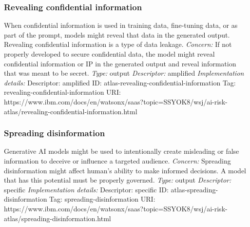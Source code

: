 \documentclass{article}
\begin{document}
\subsubsection*{Revealing confidential information}
When confidential information is used in training data, fine-tuning data, or as part of the prompt, models might reveal that data in the generated output. Revealing confidential information is a type of data leakage.\newline
\textit{Concern: }If not properly developed to secure confidential data, the model might reveal confidential information or IP in the generated output and reveal information that was meant to be secret.\newline\newline
\textit{Type: }output\newline
\textit{Descriptor: }amplified \newline\newline
\textit{Implementation details:} \newline
Descriptor: amplified \newline
ID: atlas-revealing-confidential-information \newline
Tag: revealing-confidential-information \newline
URI:  https://www.ibm.com/docs/en/watsonx/saas?topic=SSYOK8/wsj/ai-risk-atlas/revealing-confidential-information.html\newline
\subsubsection*{Spreading disinformation}
Generative AI models might be used to intentionally create misleading or false information to deceive or influence a targeted audience.\newline
\textit{Concern: }Spreading disinformation might affect human's ability to make informed decisions. A model that has this potential must be properly governed.\newline\newline
\textit{Type: }output\newline
\textit{Descriptor: }specific \newline\newline
\textit{Implementation details:} \newline
Descriptor: specific \newline
ID: atlas-spreading-disinformation \newline
Tag: spreading-disinformation \newline
URI:  https://www.ibm.com/docs/en/watsonx/saas?topic=SSYOK8/wsj/ai-risk-atlas/spreading-disinformation.html\newline
\end{document}
